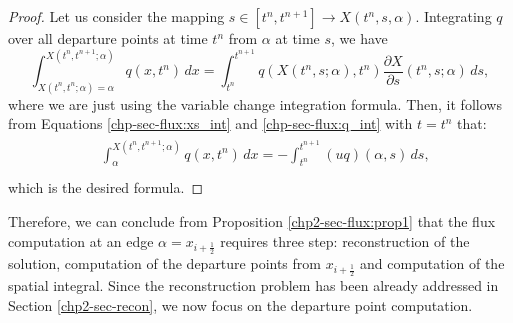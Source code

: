 \begin{proof}
	Let us consider the mapping $s\in[t^n,t^{n+1}] \to X(t^n,s,\alpha)$. 
	Integrating $q$ over all departure points at time $t^n$ from $\alpha$ at time $s$, we have
	\begin{equation}
		\label{chp-sec-flux:depint_1}
		\int^{X(t^n,t^{n+1};\alpha)}_{X(t^n,t^{n};\alpha) = \alpha} q(x,t^n)\,dx 
		= \int_{t^n}^{t^{n+1}} q(X(t^n,s;\alpha),t^n) \frac{\partial X}{\partial s} (t^n,s;\alpha)\,ds,
	\end{equation}
	where we are just using the variable change integration formula.
	Then, it follows from Equations  \eqref{chp-sec-flux:xs_int}
	and \eqref{chp-sec-flux:q_int} with $t=t^n$ that:
	\begin{align*}
		\label{chp-sec-flux:depint_2}
		\begin{split}
			&\int^{X(t^n,t^{n+1};\alpha)}_{\alpha} q(x,t^n)\,dx 
			= -\int_{t^n}^{t^{n+1}} (uq)(\alpha,s) \,ds, \\ 
		\end{split}
	\end{align*}
	which is the desired formula.
\end{proof}
Therefore, we can conclude from Proposition \ref{chp2-sec-flux:prop1} that the flux computation at
an edge $\alpha = x_{i+\frac{1}{2}}$ requires three step: reconstruction of the solution,
computation of the departure points from $x_{i+\frac{1}{2}}$ and computation of the  spatial integral.
Since the reconstruction problem has been  already addressed in Section \ref{chp2-sec-recon}, 
we now focus on the departure point computation.

